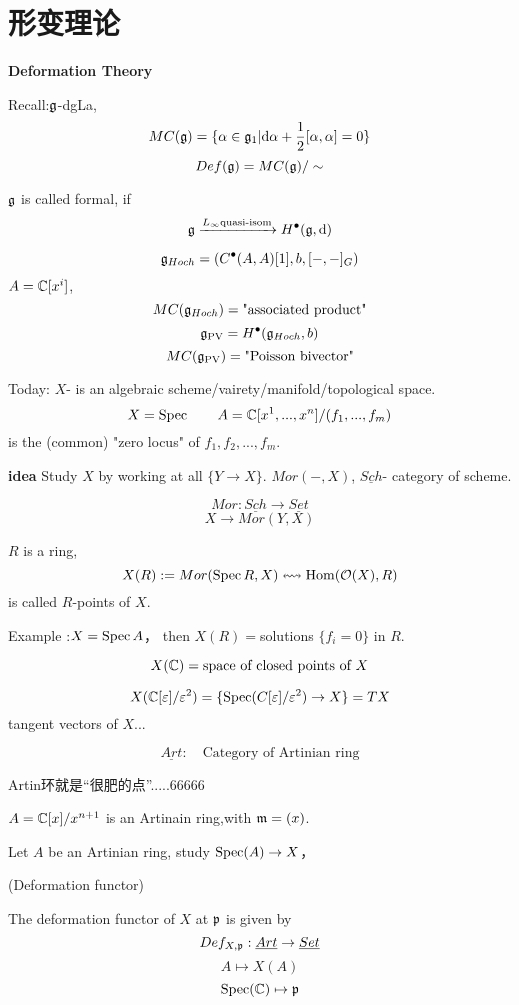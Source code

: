 \section{形变理论}
\textbf{Deformation Theory}

Recall:$\mathfrak{g}$-dgLa,
$$MC(\mathfrak{g})=\{\alpha\in\mathfrak{g}_1|\mathrm{d}\alpha+\frac{1}{2}[\alpha,\alpha]=0\}$$
$$Def(\mathfrak{g})=MC(\mathfrak{g})/\sim$$

$\mathfrak{g}$ is called formal, if
$$\mathfrak{g}\xrightarrow{L_{\infty}\text{quasi-isom}}H^{\bullet}(\mathfrak{g},\mathrm{d})$$

$$\mathfrak{g}_{Hoch}=(C^{\bullet}(A,A)[1],b,[-,-]_G)$$
$A=\mathbb{C}[x^i]$,
$$MC(\mathfrak{g}_{Hoch})=\text{"associated product"}$$
$$\mathfrak{g}_{\operatorname{PV}}=H^{\bullet}(\mathfrak{g}_{Hoch},b)$$
$$MC(\mathfrak{g}_{\operatorname{PV}})=\text{"Poisson bivector"}$$

Today:
$X$- is an algebraic scheme/vairety/manifold/topological space.
$$X=\operatorname{Spec}\qquad A=\mathbb{C}[x^1,...,x^n]/(f_1,...,f_m)$$
is the (common) "zero locus" of $f_1,f_2,...,f_m$.

\textbf{idea} Study $X$ by working at all $\{Y\to X\}$.
$Mor(-,X)$, $\underline{Sch}$- category of scheme.

$$Mor: \underline{Sch}\to\underline{Set}$$
$$X\to Mor(Y,X)$$

\begin{notation}
$R$ is a ring,
$$X(R):=Mor(\operatorname{Spec} R,X)\leftrightsquigarrow\operatorname{Hom}(\mathcal{O}(X),R)$$
is called $R$-points of $X$.
\end{notation}

Example :$X=\operatorname{Spec} A$， then $X(R)=$solutions $\{f_i=0\}$ in $R$.

\begin{example}
$$X(\mathbb{C})=\text{space of closed points of $X$}$$

$$X(\mathbb{C}[\varepsilon]/\varepsilon^2)=
\{\operatorname{Spec}(C[\varepsilon]/\varepsilon^2)\to X\}
=TX$$
tangent vectors of $X$...
\end{example}

\begin{notation}
$$\underline{Art}:\quad\text{Category of Artinian ring}$$
\end{notation}
Artin环就是“很肥的点”.....66666

\begin{example}
$A=\mathbb{C}[x]/x^{n+1}$ is an Artinain ring,with $\mathfrak{m}=(x)$.
\end{example}

Let $A$ be an Artinian ring, study $\operatorname{Spec}(A)\to X$，

\begin{definition}(Deformation functor)

The deformation functor of $X$ at $\mathfrak{p}$ is given by
$$Def_{X,\mathfrak{p}}:\underline{Art}\to\underline{Set}$$
$$A\mapsto X(A)$$
$$\operatorname{Spec}(\mathbb{C})\mapsto\mathfrak{p}$$
\end{definition}

